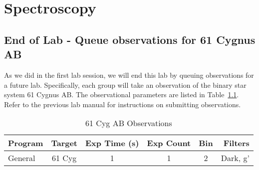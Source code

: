 \chapter{Spectroscopy}

\section{End of Lab - Queue observations for 61 Cygnus AB}

As we did in the first lab session, we will end this lab by queuing observations for a future lab. Specifically, each group will take an observation of the binary star system 61 Cygnus AB. The observational parameters are listed in Table~\ref{61Cyg_obs}. Refer to the previous lab manual for instructions on submitting observations. 

\begin{table}
    \centering
    \caption{61 Cyg AB Observations}
    \label{61Cyg_obs}
    \begin{tabular}{|l|c|c|c|c|r|}
    \hline
    \textbf{Program} & \textbf{Target} & \textbf{Exp Time (s)} & \textbf{Exp Count} & \textbf{Bin}
         & \textbf{Filters} \\
    \hline
    General & 61 Cyg & 1 & 1 & 2 & Dark, g' \\
    \hline
    \end{tabular}
\end{table} 

